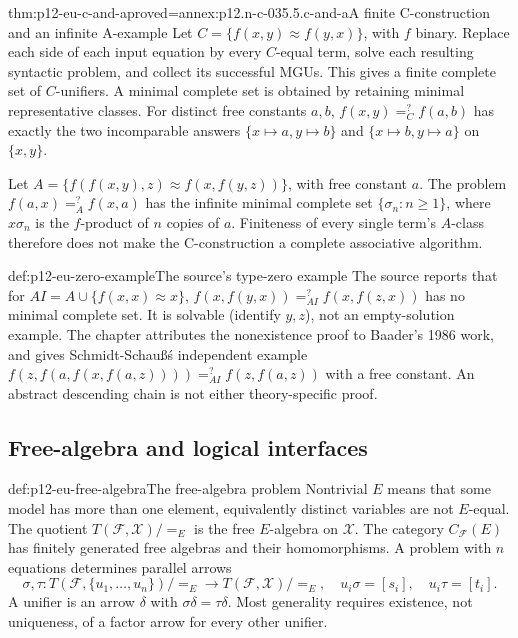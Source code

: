 \begin{hbtheorem}{thm:p12-eu-c-and-a}{proved=annex:p12.n-c-035.5.c-and-a}{A finite C-construction and an infinite A-example}
Let \(C=\{f(x,y)\approx f(y,x)\}\), with \(f\) binary. Replace
each side of each input equation by every \(C\)-equal term, solve each
resulting syntactic problem, and collect its successful MGUs. This gives
a finite complete set of \(C\)-unifiers. A minimal complete set is
obtained by retaining minimal representative classes.
For distinct free constants \(a,b\),
\(f(x,y)=^{?}_C f(a,b)\) has exactly the two incomparable answers
\(\{x\mapsto a,y\mapsto b\}\) and
\(\{x\mapsto b,y\mapsto a\}\) on \(\{x,y\}\).

Let \(A=\{f(f(x,y),z)\approx f(x,f(y,z))\}\), with free constant
\(a\). The problem \(f(a,x)=^{?}_A f(x,a)\) has the infinite minimal
complete set \(\{\sigma_n:n\geq1\}\), where \(x\sigma_n\) is the
\(f\)-product of \(n\) copies of \(a\). Finiteness of every single
term's \(A\)-class therefore does not make the C-construction a
complete associative algorithm.
\cite[Examples 3.6--3.7, pp.~471--472]{BaaderSnyder2001}
\end{hbtheorem}

\begin{proofboundary}{def:p12-eu-zero-example}{The source's type-zero example}
The source reports that for \(AI=A\cup\{f(x,x)\approx x\}\),
\(f(x,f(y,x))=^{?}_{AI}f(x,f(z,x))\) has no minimal complete set.
It is solvable (identify \(y,z\)), not an empty-solution example.
The chapter attributes the nonexistence proof to Baader's 1986 work,
and gives Schmidt-Schau\ss\'s independent example
\(f(z,f(a,f(x,f(a,z))))=^{?}_{AI}f(z,f(a,z))\) with a free constant.
An abstract descending chain is not either theory-specific proof.
\cite[Example 3.8, p.~472]{BaaderSnyder2001}
\end{proofboundary}

\subsection{Free-algebra and logical interfaces}

\begin{hbdefinition}{def:p12-eu-free-algebra}{The free-algebra problem}
Nontrivial \(E\) means that some model has more than one element,
equivalently distinct variables are not \(E\)-equal.
The quotient \(T(\mathcal F,\mathcal X)/{=_{E}}\) is the free
\(E\)-algebra on \(\mathcal X\). The category \(C_{\mathcal F}(E)\)
has finitely generated free algebras and their homomorphisms.
A problem with \(n\) equations determines parallel arrows
\[
 \sigma,\tau:T(\mathcal F,\{u_1,\ldots,u_n\})/{=_{E}}
       \longrightarrow T(\mathcal F,\mathcal X)/{=_{E}},
 \quad u_i\sigma=[s_i],\quad u_i\tau=[t_i].
\]
A unifier is an arrow \(\delta\) with \(\sigma\delta=\tau\delta\).
Most generality requires existence, not uniqueness, of a factor arrow
for every other unifier. \cite[\S3.3.2--3.3.3, pp.~477--482]{BaaderSnyder2001}
\end{hbdefinition}

